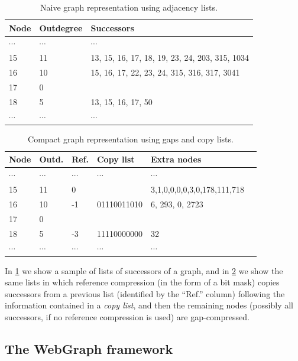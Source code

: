 \begin{table}
  \centering
  \caption{Naive graph representation using adjacency lists.}%
  \label{tab:compression-naive}
  \begin{tabular}{|l|l|l|}
    \hline
    \textbf{Node} & \textbf{Outdegree} & \textbf{Successors} \\
    \hline
    $\cdots$ & $\cdots$ & $\cdots$\\
    15 & 11 & 13, 15, 16, 17, 18, 19, 23, 24, 203, 315, 1034\\
    16 & 10 & 15, 16, 17, 22, 23, 24, 315, 316, 317, 3041\\
    17 & 0 & \\
    18 & 5 & 13, 15, 16, 17, 50\\
    $\cdots$ & $\cdots$ & $\cdots$
  \end{tabular}
\end{table}

\begin{table}
  \centering
  \caption{Compact graph representation using gaps and copy lists.}%
  \label{tab:compression-copy}
  \begin{tabular}{|l|l|l|l|l|l}
    \hline
    \textbf{Node}
    & \textbf{Outd.}
    & \textbf{Ref.}
    & \textbf{Copy list}
    & \textbf{Extra nodes}
    \\
    \hline
    $\cdots$ & $\cdots$ & $\cdots$ & $\cdots$ & $\cdots$ \\
    15 & 11 & 0 & & 3,1,0,0,0,0,3,0,178,111,718 \\
    16 & 10 & -1 & 01110011010 & 6, 293, 0, 2723 \\
    17 & 0 & & & \\
    18 & 5  & -3 & 11110000000 & 32 \\
    $\cdots$ & $\cdots$ & $\cdots$ & $\cdots$ & $\cdots$  
  \end{tabular}
\end{table}

In \cref{tab:compression-naive} we show a sample of lists of successors of
a graph, and in \cref{tab:compression-copy} we show the same lists in
which reference compression (in the form of a bit mask) copies successors from
a previous list (identified by the ``Ref.'' column) following the information
contained in a \emph{copy list}, and then the remaining nodes (possibly all
successors, if no reference compression is used) are gap-compressed.

\subsection{The WebGraph framework}

